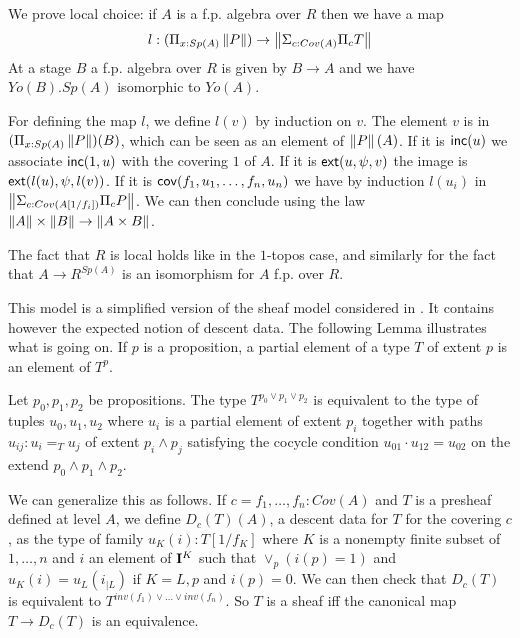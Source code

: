 We prove local choice: if $A$ is a f.p. algebra over $R$ then we have a map
$$
l:(\Pi_{x:Sp(A)}\left\lVert P \right\rVert)\rightarrow \left\lVert \Sigma_{c:Cov(A)}\Pi_cT \right\rVert
$$
At a stage $B$ a f.p. algebra over $R$ is given by $B\rightarrow A$ and we have $Yo(B).Sp(A)$ isomorphic
to $Yo(A)$.

For defining the map $l$, we define $l(v)$ by induction on $v$.
The element $v$ is in $(\Pi_{x:Sp(A)}\left\lVert P \right\rVert)(B)$, which can be seen as
an element of $\left\lVert P \right\rVert(A)$. If it is $\mathsf{inc}(u)$ we associate $\mathsf{inc}(1,u)$ with the covering $1$ of $A$.
If it is $\mathsf{ext}(u,\psi,v)$ the image is $\mathsf{ext}(l(u),\psi,l(v))$.
If it is $\mathsf{cov}(f_1,u_1,\dots,f_n,u_n)$ we have by induction $l(u_i)$ in $\left\lVert \Sigma_{c:Cov(A[1/f_i])}\Pi_c P \right\rVert$.
We can then conclude using the law $\left\lVert A \right\rVert\times \left\lVert B \right\rVert\rightarrow\left\lVert A\times B \right\rVert$.

\medskip

The fact that $R$ is local holds like in the $1$-topos case, and similarly for the fact that
$A\rightarrow R^{Sp(A)}$ is an isomorphism for $A$ f.p. over $R$.

\medskip

 This model is a  simplified version of the sheaf model considered in \cite{CRS21}. It contains however the expected notion
of descent data. The following Lemma illustrates what is going on. If $p$ is a proposition, a partial element of a type $T$ of
extent $p$ is an element of $T^p$.

\begin{lemma}
  Let $p_0,p_1,p_2$ be propositions. The type $T^{p_0\vee p_1\vee p_2}$ is equivalent to the type of tuples $u_0,u_1,u_2$
  where $u_i$ is a partial element of extent $p_i$ together with paths $u_{ij}:u_i =_T u_j$ of extent $p_i\wedge p_j$
  satisfying the cocycle condition $u_{01}\cdot u_{12} = u_{02}$ on the extend $p_0\wedge p_1\wedge p_2$.
\end{lemma}

We can generalize this as follows. If $c = f_1,\dots,f_n:Cov(A)$  and $T$ is a presheaf defined at level $A$, we define
$D_c(T)(A)$, a descent data for $T$ for the covering $c$, as the type of family $u_K(i):T[1/f_K]$ where $K$ is a nonempty
finite subset of $1,\dots,n$ and $i$ an element of $\mathbf{I}^K$ such that $\vee_p (i(p) = 1)$ and $u_K(i) = u_L(i_{|L})$
if $K = L,p$ and $i(p) = 0$. We can then check that $D_c(T)$ is equivalent to $T^{inv(f_1)\vee\dots\vee inv(f_n)}$.
So $T$ is a sheaf iff the canonical map $T\rightarrow D_c(T)$ is an equivalence.

\medskip

